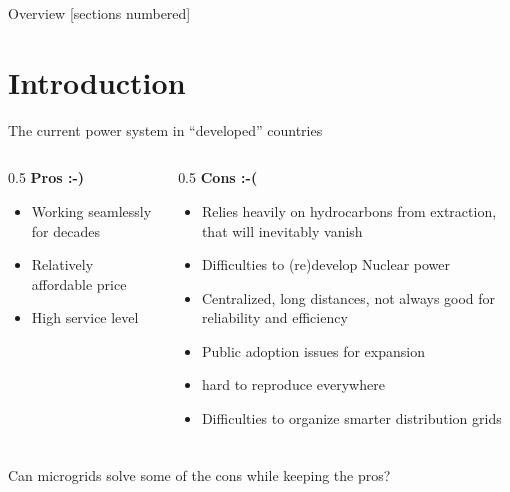 \titleframe

\begin{frame}{Overview}
  [sections numbered]
  \tableofcontents[hideallsubsections]
\end{frame}


\section{Introduction}

\begin{frame}{The current power system in ``developed'' countries}
    \begin{columns}
        \begin{column}{0.5\textwidth}
            \textbf{Pros :-)}
            \begin{itemize}
                \item Working seamlessly for decades
                \item Relatively affordable price
                \item High service level
            \end{itemize}
        \end{column}
        \begin{column}{0.5\textwidth}
            \textbf{Cons :-(}
            \begin{itemize}
              \item Relies heavily on hydrocarbons from extraction, that will inevitably vanish
              \item Difficulties to (re)develop Nuclear power
              \item Centralized, long distances, not always good for reliability and efficiency
              \item Public adoption issues for expansion
              \item hard to reproduce everywhere
              \item Difficulties to organize smarter distribution grids
            \end{itemize}
        \end{column}
    \end{columns}
\end{frame}

\begin{frame}
  \frametitle{}
  \centering \LARGE
  Can microgrids solve some of the cons while keeping the pros?

\end{frame}

